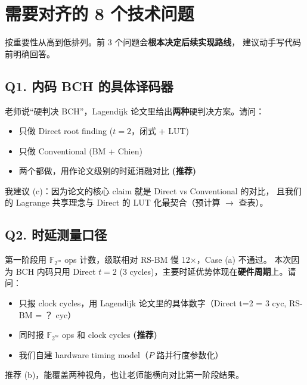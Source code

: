 \documentclass[11pt,a4paper]{article}
\begin{document}
\section{需要对齐的 8 个技术问题}

按重要性从高到低排列。前 3 个问题会\textbf{根本决定后续实现路线}，
建议动手写代码前明确回答。

\subsection{Q1. 内码 BCH 的具体译码器}

\begin{actionbox}[title=\textbf{Q1. Direct 还是 Conventional？还是两者对比？}]
老师说``硬判决 BCH''，Lagendijk 论文里给出\textbf{两种}硬判决方案。请问：

\begin{itemize}[leftmargin=1em, itemsep=1pt]
\item [(a)] 只做 Direct root finding ($t=2$，闭式 + LUT)
\item [(b)] 只做 Conventional (BM + Chien)
\item [(c)] 两个都做，用作论文级别的时延消融对比 \textbf{(推荐)}
\end{itemize}

我建议 (c)：因为论文的核心 claim 就是 Direct vs Conventional 的对比，
且我们的 Lagrange 共享理念与 Direct 的 LUT 化最契合（预计算 $\to$ 查表）。
\end{actionbox}

\subsection{Q2. 时延测量口径}

\begin{actionbox}[title=\textbf{Q2. Clock cycles 还是 F$_{2^m}$ ops？}]
第一阶段用 $\mathbb{F}_{2^m}$ ops 计数，级联相对 RS-BM 慢 12$\times$，Case (a) 不通过。
本次因为 BCH 内码只用 Direct $t=2$ (3 cycles)，主要时延优势体现在\textbf{硬件周期}上。请问：

\begin{itemize}[leftmargin=1em, itemsep=1pt]
\item [(a)] 只报 clock cycles，用 Lagendijk 论文里的具体数字（Direct t=2 = 3 cyc, RS-BM = ？ cyc）
\item [(b)] 同时报 $\mathbb{F}_{2^m}$ ops 和 clock cycles \textbf{(推荐)}
\item [(c)] 我们自建 hardware timing model（$P$ 路并行度参数化）
\end{itemize}

推荐 (b)，能覆盖两种视角，也让老师能横向对比第一阶段结果。
\end{actionbox}
\end{document}
